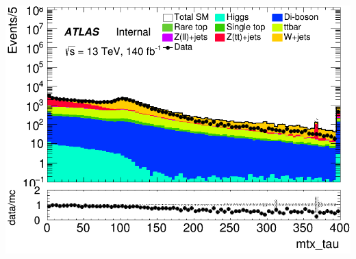 \documentclass[usenames,dvipsnames]{beamer}
\begin{document}
\begin{frame}
\begin{minipage}{0.32\textwidth}
        \includegraphics[width=\textwidth]{graphics/LH_met/LH_met_mtx_tau.png}
    \end{minipage}
\end{frame}
\end{document}
